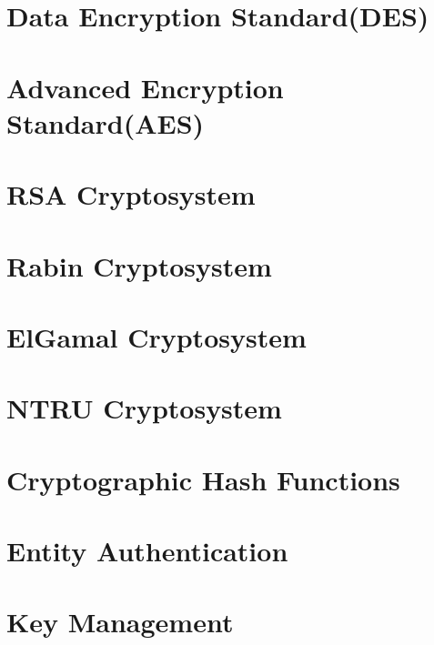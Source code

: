 \documentclass{report}
\begin{document}
		
	\section{Data Encryption Standard(DES)}
		
		
	\section{Advanced Encryption Standard(AES)}
		
		
	\section{RSA Cryptosystem}
		
		
	\section{Rabin Cryptosystem}
		
		
	\section{ElGamal Cryptosystem}
		
		
	\section{NTRU Cryptosystem}
		
		
	\section{Cryptographic Hash Functions}
		
		
	\section{Entity Authentication}
		
		
	\section{Key Management}
		
		
\end{document}
